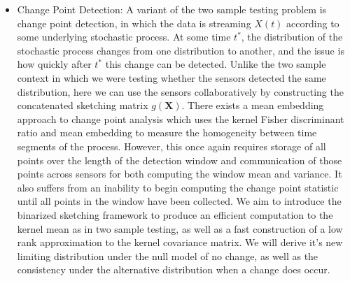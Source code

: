 \begin{itemize}


\item Change Point Detection: A variant of the two sample testing problem is change point detection, in which the data is streaming $X(t)$ according to some underlying stochastic process.  At some time $t^*$, the distribution of the stochastic process changes from one distribution to another, and the issue is how quickly after $t^*$ this change can be detected.   Unlike the two sample context in which we were testing whether the sensors detected the same distribution, here we can use the sensors collaboratively by constructing the concatenated sketching matrix $g(\mathbf{X})$.
There exists a mean embedding approach to change point analysis \cite{harchaoui2009kernel} which uses the kernel Fisher discriminant ratio and mean embedding to measure the homogeneity between time segments of the process.  However, this once again requires storage of all points over the length of the detection window and communication of those points across sensors for both computing the window mean and variance. It also suffers from an inability to begin computing the change point statistic until all points in the window have been collected.  We aim to introduce the binarized sketching framework to produce an efficient computation to the kernel mean as in two sample testing, as well as a fast construction of a low rank approximation to the kernel covariance matrix.  We will derive it's new limiting distribution under the null model of no change, as well as the consistency under the alternative distribution when a change does occur.  


\end{itemize}
